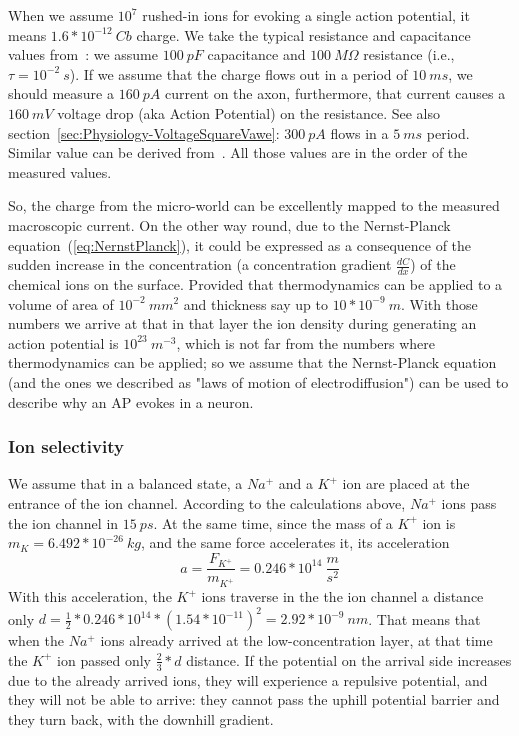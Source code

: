 When we assume $10^7$ rushed-in ions for evoking a single action potential, it means $1.6*10^{-12}\ Cb$ charge. We take the typical resistance and capacitance values from~\cite{KochBiophysics:1999}:
we assume $100\ pF$ capacitance and $100\ M\Omega$ resistance (i.e., $\tau=10^{-2}\ s$). 
If we assume that the charge flows out in a period of $10\ ms$, we should measure a $160\ pA$ current on the axon, furthermore, that current causes a $160\ mV$ voltage drop (aka Action Potential) on the resistance.
See also section~\ref{sec:Physiology-VoltageSquareVawe}: $300\ pA$ flows
in a $5\ ms$ period.
Similar value can be derived from~\cite{BeanActionPotential:2007}.
All those values are in the order of the measured values.


 
So, the charge from the micro-world can be excellently mapped to the measured macroscopic current. On the other way round, due to the Nernst-Planck equation~(\ref{eq:NernstPlanck}), 
it could be expressed as a consequence of the sudden increase in the concentration (a concentration gradient $\frac{dC}{dx}$) of the chemical ions on the surface.
Provided that thermodynamics can be applied to a volume of area of $10^{-2}\ mm^2$ and thickness say up to $10*10^{-9}\ m$.
With those numbers we arrive at that in that layer the ion density during generating an action potential is  $10^{23}\ m^{-3}$, which is not far from the numbers where thermodynamics can be applied;
so we assume that the Nernst-Planck equation (and the ones we described as "laws of motion of electrodiffusion") can be used to describe why an
\gls{AP}
evokes in a neuron.



\subsubsection{Ion selectivity\label{sec:Physics-DynIonSelectivity}}
We assume that in a balanced state, a  $Na^{+}$ and a  $K^{+}$
ion are placed at the entrance of the ion channel.
According to the calculations above, $Na^{+}$ ions pass the ion channel in $15\ ps$.
%
At the same time, since the mass of a $K^+$ ion is $m_{K} = 6.492* 10^{-26}\ kg$, 
and the same force accelerates it, its acceleration
\begin{equation}
a=\frac{F_{K^+}}{m_{K^+}} = 0.246 * 10^{14}\ \frac{m}{s^{2}}
\end{equation}
With this acceleration, the $K^+$ ions traverse in the the ion channel a distance only
$d=\frac{1}{2}*0.246 * 10^{14}*(1.54*10^{-11})^2 = 2.92 * 10^{-9}\ nm$.
That means that when the $Na^+$ ions already arrived at the low-concentration layer,
at that time the $K^+$ ion passed only $\frac{2}{3}*d$ distance. If the potential on the 
arrival side increases due to the already arrived ions, they will experience 
a repulsive potential, and they will not be able to arrive: they cannot pass 
the uphill potential barrier and they turn back, with the downhill gradient.


